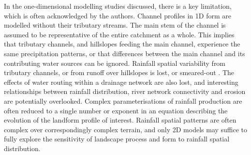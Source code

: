In the one-dimensional modelling studies discussed, there is a key limitation, which is often acknowledged by the authors. Channel profiles in 1D form are modelled without their tributary streams. The main stem of the channel is assumed to be representative of the entire catchment as a whole. This implies that tributary channels, and hillslopes feeding the main channel, experience the same precipitation patterns, or that differences between the main channel and its contributing water sources can be ignored. Rainfall spatial variability from tributary channels, or from runoff over hillslopes is lost, or smeared-out \citep{Roe2002}. The effects of water routing within a drainage network are also lost, and interesting relationships between rainfall distribution, river network connectivity and erosion are potentially overlooked. Complex parameterisations of rainfall production are often reduced to a single number or exponent in an equation describing the evolution of the landform profile of interest. Rainfall spatial patterns are often complex over correspondingly complex terrain, and only 2D models may suffice to fully explore the sensitivity of landscape process and form to rainfall spatial distribution.


